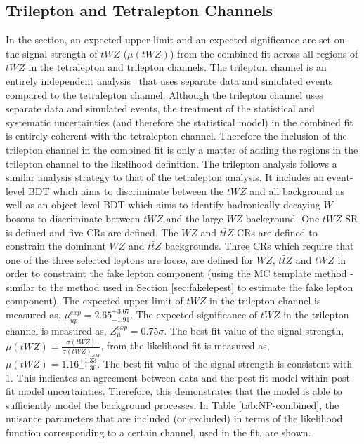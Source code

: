 \subsection{Trilepton and Tetralepton Channels}
\label{sec:combined-results}
In the section, an expected upper limit and an expected significance are set on the signal strength of $tWZ$ ($\mu (tWZ)$) from the combined fit across all regions of $tWZ$ in the tetralepton and trilepton channels. The trilepton channel is an entirely independent analysis~\cite{ben-thesis} that uses separate data and simulated events compared to the tetralepton channel. Although the trilepton channel uses separate data and simulated events, the treatment of the statistical and systematic uncertainties (and therefore the statistical model) in the combined fit is entirely coherent with the tetralepton channel. Therefore the inclusion of the trilepton channel in the combined fit is only a matter of adding the regions in the trilepton channel to the likelihood definition. The trilepton analysis follows a similar analysis strategy to that of the tetralepton analysis. It includes an event-level BDT which aims to discriminate between the $tWZ$ and all background as well as an object-level BDT which aims to identify hadronically decaying $W$ bosons to discriminate between $tWZ$ and the large $WZ$ background. One $tWZ$ SR is defined and five CRs are defined. The $WZ$ and $t\bar{t}Z$ CRs are defined to constrain the dominant $WZ$ and $t\bar{t}Z$ backgrounds. Three CRs which require that one of the three selected leptons are loose, are defined for $WZ$, $t\bar{t}Z$ and $tWZ$ in order to constraint the fake lepton component (using the MC template method - similar to the method used in Section \ref{sec:fakelepest} to estimate the fake lepton component). The expected upper limit of $tWZ$ in the trilepton channel is measured as, $\mu_{up}^{exp} =   2.65^{+3.67}_{-1.91}$. The expected significance of $tWZ$ in the trilepton channel is measured as, $Z_{\mu}^{exp} =   0.75\sigma$. The best-fit value of the signal strength, $\mu (tWZ)= \frac{\sigma(tWZ)}{\sigma(tWZ)_{SM}}$, from the likelihood fit is measured as, $\mu (tWZ) =   1.16^{+1.33}_{-1.30}$. The best fit value of the signal strength is consistent with 1. This indicates an agreement between data and the post-fit model within post-fit model uncertainties. Therefore, this demonstrates that the model is able to sufficiently model the background processes. In Table \ref{tab:NP-combined}, the nuisance parameters that are included (or excluded) in terms of the likelihood function corresponding to a certain channel, used in the fit, are shown.
